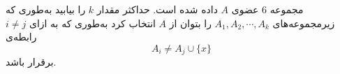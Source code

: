 \EXERCISE
مجموعه
$6$
عضوی
$A$
داده شده است. حداکثر مقدار
$k$
را بیابید به‌طوری که زیرمجموعه‌های
$A_1, A_2, \cdots, A_k$
را بتوان از
$A$
انتخاب کرد به‌طوری که به ازای
$i \neq j$
رابطه‌ی
$$A_i \neq A_j \cup \{x\}$$
برقرار باشد.